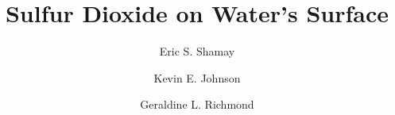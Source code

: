 \documentclass{article}
\title{Sulfur Dioxide on Water's Surface}
\author{Eric S. Shamay \and Kevin E. Johnson \and Geraldine L. Richmond}
\begin{document}
\newcommand{\suldiox}{SO$_2$}
\newcommand{\ang}{\,$\textrm{\AA}$}
\newcommand{\angs}{\ang}
\newcommand{\wat}{H$_2$O}


\linenumbers 
\doublespacing




%
%
%
%
%
%


\end{document}
